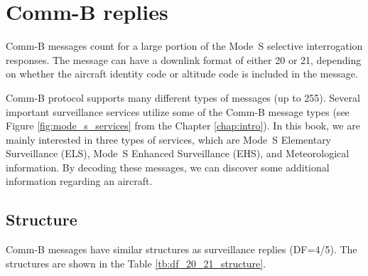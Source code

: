 \chapter{Comm-B replies} \label{chap:comm-b}

Comm-B messages count for a large portion of the Mode~S selective interrogation responses. The message can have a downlink format of either 20 or 21, depending on whether the aircraft identity code or altitude code is included in the message.

Comm-B protocol supports many different types of messages (up to 255). Several important surveillance services utilize some of the Comm-B message types (see Figure \ref{fig:mode_s_services} from the Chapter \ref{chap:intro}). In this book, we are mainly interested in three types of services, which are Mode~S Elementary Surveillance (ELS), Mode~S Enhanced Surveillance (EHS), and Meteorological information. By decoding these messages, we can discover some additional information regarding an aircraft.


\section{Structure}

Comm-B messages have similar structures as surveillance replies (DF=4/5). The structures are shown in the Table \ref{tb:df_20_21_structure}.

